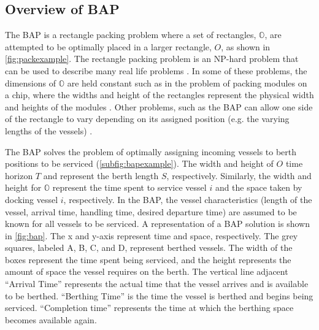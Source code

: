 \documentclass[utf8]{FrontiersinHarvard}
\let\cite\citep                                       %
\begin{document}
\subsection{Overview of BAP}
\label{sec:overview-of-bap}
The BAP is a rectangle packing problem where a set of rectangles, \(\mathbb{O}\), are attempted to be optimally placed in
a larger rectangle, \(O\), as shown in \autoref{fig:packexample}. The rectangle packing problem is an NP-hard problem that
can be used to describe many real life problems \cite{bruin-2013-rectan-packin,murata-1995-rectan}. In some of these
problems, the dimensions of \(\mathbb{O}\) are held constant such as in the problem of packing modules on a chip, where
the widths and height of the rectangles represent the physical width and heights of the modules
\cite{murata-1995-rectan}. Other problems, such as the BAP can allow one side of the rectangle to vary depending on its
assigned position (e.g. the varying lengths of the vessels) \cite{buhrkal-2011-model-discr}.

The BAP solves the problem of optimally assigning incoming vessels to berth positions to be serviced
(\autoref{subfig:bapexample}). The width and height of \(O\) time horizon \(T\) and represent the berth length \(S\),
respectively. Similarly, the width and height for \(\mathbb{O}\) represent the time spent to service vessel \(i\) and the
space taken by docking vessel \(i\), respectively. In the BAP, the vessel characteristics (length of the vessel, arrival
time, handling time, desired departure time) are assumed to be known for all vessels to be serviced. A representation of
a BAP solution is shown in \autoref{fig:bap}. The x and y-axis represent time and space, respectively. The grey squares,
labeled A, B, C, and D, represent berthed vessels. The width of the boxes represent the time spent being serviced, and
the height represents the amount of space the vessel requires on the berth. The vertical line adjacent
 ``Arrival Time'' represents the actual
time that the vessel arrives and is available to be berthed. ``Berthing Time'' is the time the vessel is berthed and
begins being serviced. ``Completion time'' represents the time at which the berthing space becomes available again.
\end{document}
